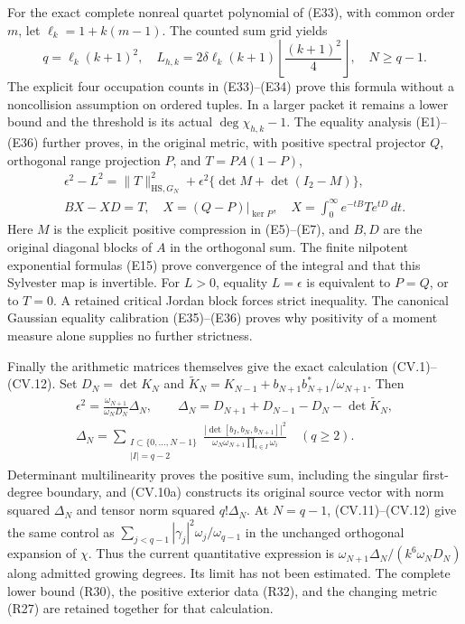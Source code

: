 For the exact complete nonreal quartet polynomial of (E33), with
common order $m$, let $\ell_k=1+k(m-1)$. The counted sum grid yields
\[
 q=\ell_k(k+1)^2,\quad
 L_{h,k}=2\delta\ell_k(k+1)
 \left\lfloor\frac{(k+1)^2}{4}\right\rfloor,\quad N\ge q-1.
 \tag{R30}
\]
The explicit four occupation counts in (E33)--(E34) prove this formula
without a noncollision assumption on ordered tuples. In a larger
packet it remains a lower bound and the threshold is its actual
$\deg\chi_{h,k}-1$. The equality analysis (E1)--(E36) further proves,
in the original metric, with positive spectral projector $Q$,
orthogonal range projection $P$, and $T=PA(1-P)$,
\[
 \begin{gathered}
 \epsilon^2-L^2=\|T\|_{\mathrm{HS},G_N}^2
       +\epsilon^2\{\det M+\det(I_2-M)\},\\
 BX-XD=T,\quad X=(Q-P)|_{\ker P},\quad
 X=\int_0^\infty e^{-tB}T e^{tD}\,dt.
\end{gathered}
 \tag{R31}
\]
Here $M$ is the explicit positive compression in (E5)--(E7),
and $B,D$ are the original diagonal blocks of $A$ in the orthogonal
sum. The finite nilpotent exponential formulas (E15) prove convergence
of the integral and that this Sylvester map is invertible.
For $L>0$, equality $L=\epsilon$ is equivalent to $P=Q$, or to
$T=0$. A retained critical Jordan block forces strict inequality.
The canonical Gaussian equality calibration (E35)--(E36) proves why
positivity of a moment measure alone supplies no further strictness.

Finally the arithmetic matrices themselves give the exact calculation
(CV.1)--(CV.12). Set $D_N=\det K_N$ and
$\widetilde K_N=K_{N-1}+b_{N+1}b_{N+1}^*/\omega_{N+1}$.
Then
\[
 \begin{gathered}
 \epsilon^2=\frac{\omega_{N+1}}{\omega_ND_N}\Delta_N,\qquad
 \Delta_N=D_{N+1}+D_{N-1}-D_N-\det\widetilde K_N,\\
 \Delta_N=\sum_{\substack{I\subset\{0,\ldots,N-1\}\\|I|=q-2}}
 \frac{|\det[b_I,b_N,b_{N+1}]|^2}
 {\omega_N\omega_{N+1}\prod_{i\in I}\omega_i}\quad(q\ge2).
\end{gathered}
 \tag{R32}
\]
Determinant multilinearity proves the positive sum, including the
singular first-degree boundary, and (CV.10a) constructs its original
source vector with norm squared $\Delta_N$ and tensor norm squared
$q!\Delta_N$. At $N=q-1$, (CV.11)--(CV.12) give the same control as
$\sum_{j<q-1}|\gamma_j|^2\omega_j/\omega_{q-1}$ in the unchanged
orthogonal expansion of $\chi$. Thus the current quantitative
expression is $\omega_{N+1}\Delta_N/(k^6\omega_ND_N)$ along
admitted growing degrees. Its limit has not been estimated. The
complete lower bound (R30), the positive exterior data (R32), and
the changing metric (R27) are retained together for that calculation.

